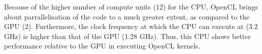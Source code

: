 Because of the higher number of compute units (12) for the CPU, OpenCL brings about parrallelisation of the code to a much greater extent, as compared to the GPU (2). Furthermore, the clock frequency at which the CPU can execute at (3.2 GHz) is higher than that of  the GPU (1.28 GHz). Thus, this CPU shows better performance relative to the GPU in executing OpenCL kernels.